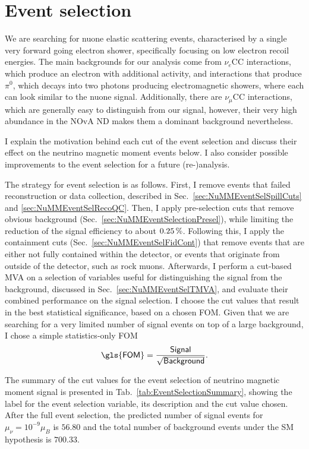 \section{Event selection}\label{sec:NuMMEventSelection}
We are searching for \gls{nuone} elastic scattering events, characterised by a single very forward going electron shower, specifically focusing on low electron recoil energies. The main backgrounds for our analysis come from $\nu_e$\gls{CC} interactions, which produce an electron with additional activity, and interactions that produce $\pi^0$, which decays into two photons producing electromagnetic showers, where each can look similar to the \gls{nuone} signal. Additionally, there are $\nu_\mu$\gls{CC} interactions, which are generally easy to distinguish from our signal, however, their very high abundance in the \gls{NOvA} \gls{ND} makes them a dominant background nevertheless.

I explain the motivation behind each cut of the event selection and discuss their effect on the neutrino magnetic moment events below. I also consider possible improvements to the event selection for a future (re-)analysis.

The strategy for event selection is as follows. First, I remove events that failed reconstruction or data collection, described in Sec.~\ref{sec:NuMMEventSelSpillCuts} and \ref{sec:NuMMEventSelRecoQC}. Then, I apply pre-selection cuts that remove obvious background (Sec.~\ref{sec:NuMMEventSelectionPresel}), while limiting the reduction of the signal efficiency to about $\unit[0.25]{\%}$. Following this, I apply the containment cuts (Sec.~\ref{sec:NuMMEventSelFidCont}) that remove events that are either not fully contained within the detector, or events that originate from outside of the detector, such as rock muons. Afterwards, I perform a cut-based \gls{MVA} on a selection of variables useful for distinguishing the signal from the background, discussed in Sec.~\ref{sec:NuMMEventSelTMVA}, and evaluate their combined performance on the signal selection. I choose the cut values that result in the best statistical significance, based on a chosen \gls{FOM}. Given that we are searching for a very limited number of signal events on top of a large background, I chose a simple statistics-only \gls{FOM}
\begin{equation}\label{eq:NuMMFOM}
\textsf{\gls{FOM}} = \frac{\textsf{Signal}}{\sqrt{\textsf{Background}}}.
\end{equation}

The summary of the cut values for the event selection of neutrino magnetic moment signal is presented in Tab.~\ref{tab:EventSelectionSummary}, showing the label for the event selection variable, its description and the cut value chosen. After the full event selection, the predicted number of signal events for $\mu_\nu=10^{-9}\mu_B$ is $56.80$ and the total number of background events under the \gls{SM} hypothesis is $700.33$.

